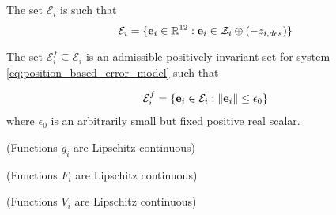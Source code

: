 The set $\mathcal{E}_i$ is such that
$$\mathcal{E}_i = \{\bm{\mathbf{e}}_i \in \mathbb{R}^{12} : \bm{\mathbf{e}}_i \in \mathcal{Z}_i \oplus (-z_{i,des} )\}$$

The set $\mathcal{E}_i^f \subseteq \mathcal{E}_i$ is an admissible positively
invariant set  for system \eqref{eq:position_based_error_model}
such that

\begin{align}
  \mathcal{E}_i^f = \{\bm{\mathbf{e}}_i \in \mathcal{E}_i : \|\bm{\mathbf{e}}_i\| \leq \epsilon_0 \}
\end{align}
where $\epsilon_0$ is an arbitrarily small but fixed positive real scalar.


\begin{gg_box}
\begin{assumption} (Functions $g_i$ are Lipschitz continuous)
  \label{ass:g_i_Lipschitz}
\end{assumption}
\end{gg_box}

\begin{gg_box}
\begin{assumption} (Functions $F_i$ are Lipschitz continuous)
  \label{ass:F_i_Lipschitz}
\end{assumption}
\end{gg_box}


\begin{gg_box}
\begin{assumption} (Functions $V_i$ are Lipschitz continuous)
  \label{ass:V_i_Lipschitz}
\end{assumption}
\end{gg_box}
